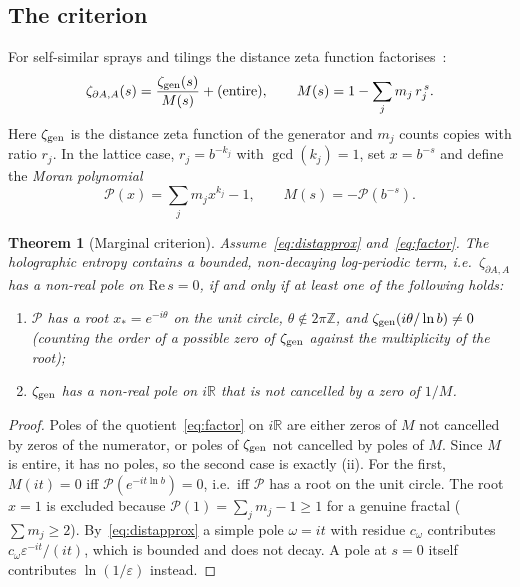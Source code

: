 \documentclass[11pt]{article}
\newtheorem{theorem}{Theorem}
\theoremstyle{definition}\newtheorem{definition}{Definition}[section]
\theoremstyle{remark}\newtheorem*{remark}{Remark}
\newcommand{\RR}{\mathbb{R}}
\newcommand{\ZZ}{\mathbb{Z}}
\begin{document}
\subsection{The criterion}
For self-similar sprays and tilings the distance zeta function factorises~\cite{LRZ,LapidusPearse}:
\begin{equation}
\zeta_{\partial A,A}(s)=\frac{\zeta_{\rm gen}(s)}{M(s)}+(\text{entire}),\qquad
M(s)=1-\sum_jm_j\,r_j^{\,s}.
\label{eq:factor}
\end{equation}
Here $\zeta_{\rm gen}$ is the distance zeta function of the generator and $m_j$ counts copies with ratio $r_j$.
In the lattice case, $r_j=b^{-k_j}$ with $\gcd(k_j)=1$, set $x=b^{-s}$ and define the \emph{Moran polynomial}
\begin{equation}
\mathcal P(x)=\sum_jm_jx^{k_j}-1,\qquad M(s)=-\mathcal P(b^{-s}).
\end{equation}

\begin{theorem}[Marginal criterion]
\label{thm:marginal}
Assume~\eqref{eq:distapprox} and~\eqref{eq:factor}. The holographic entropy contains a bounded, non-decaying
log-periodic term, i.e.\ $\zeta_{\partial A,A}$ has a non-real pole on $\mathrm{Re}\,s=0$, if and only if
at least one of the following holds:
\begin{enumerate}
\item[(i)] $\mathcal P$ has a root $x_*=e^{-i\theta}$ on the unit circle, $\theta\notin2\pi\ZZ$, and
$\zeta_{\rm gen}(i\theta/\ln b)\ne0$ (counting the order of a possible zero of $\zeta_{\rm gen}$ against
the multiplicity of the root);
\item[(ii)] $\zeta_{\rm gen}$ has a non-real pole on $i\RR$ that is not cancelled by a zero of $1/M$.
\end{enumerate}
\end{theorem}
\begin{proof}
Poles of the quotient~\eqref{eq:factor} on $i\RR$ are either zeros of $M$ not cancelled by zeros of the
numerator, or poles of $\zeta_{\rm gen}$ not cancelled by poles of $M$. Since $M$ is entire, it has no poles,
so the second case is exactly (ii). For the first, $M(it)=0$ iff $\mathcal P(e^{-it\ln b})=0$, i.e.\ iff
$\mathcal P$ has a root on the unit circle. The root $x=1$ is excluded because
$\mathcal P(1)=\sum_jm_j-1\ge1$ for a genuine fractal ($\sum m_j\ge2$). By~\eqref{eq:distapprox} a simple
pole $\omega=it$ with residue $c_\omega$ contributes $c_\omega\varepsilon^{-it}/(it)$, which is bounded and does
not decay. A pole at $s=0$ itself contributes $\ln(1/\varepsilon)$ instead.
\end{proof}
\end{document}
